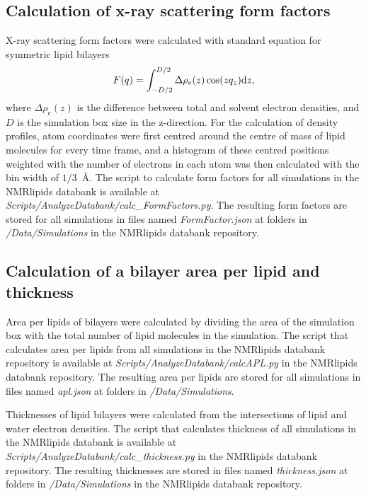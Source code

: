 \documentclass[fleqn,10pt]{wlscirep}
\begin{document}
\subsection{Calculation of x-ray scattering form factors}
X-ray scattering form factors were calculated with standard equation for symmetric lipid bilayers~\cite{ollila16}
\begin{equation}\label{FFsimpl}
F(q)=\int_{-D/2}^{D/2}\Delta \rho_e(z) \cos(zq_z) {\rm d}z,
\end{equation}
where $\Delta \rho_e(z)$ is the difference between total and solvent electron densities, and $D$ is the simulation box size in the z-direction. For the calculation of density profiles, atom coordinates were first centred around the centre of mass of lipid molecules for every time frame, and a histogram of these centred positions weighted with the number of electrons in each atom was then calculated with the bin width of $1/3$~Å. 
The script to calculate form factors for all simulations in the NMRlipids databank is available at {\it Scripts/AnalyzeDatabank/calc\_FormFactors.py}. The resulting form factors are stored for all simulations in files named {\it FormFactor.json} at folders in {\it /Data/Simulations} in the NMRlipids databank repository.

\subsection{Calculation of a bilayer area per lipid and thickness}
Area per lipids of bilayers were calculated by dividing the area of the simulation box with the total number of lipid molecules in the simulation. The script that calculates area per lipids from all simulations in the NMRlipids databank repository is available at {\it Scripts/AnalyzeDatabank/calcAPL.py} in the NMRlipids databank repository. The resulting area per lipids are stored for all simulations in files named {\it apl.json} at folders in {\it /Data/Simulations}. 

Thicknesses of lipid bilayers were calculated from the intersections of lipid and water electron densities. The script that calculates thickness of all simulations in the NMRlipids databank is available at {\it Scripts/AnalyzeDatabank/calc\_thickness.py} in the NMRlipids databank repository. The resulting thicknesses are stored in files named {\it thickness.json} at folders in {\it /Data/Simulations} in the NMRlipids databank repository. 
\end{document}
